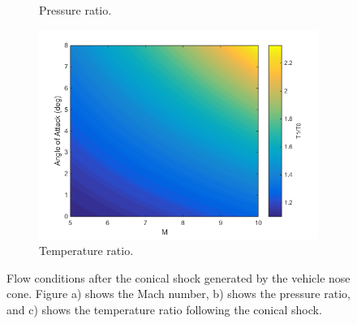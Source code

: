 \begin{figure}
\begin{subfigure}{.5\textwidth}
\caption{Pressure ratio.}
\label{fig:ConicalP}
\end{subfigure}
\begin{subfigure}{.5\textwidth}
\centering
\includegraphics[width=0.99\linewidth]{figures/3_vehicle_design/ConicalT}
\caption{Temperature ratio.}
\label{fig:ConicalT}
\end{subfigure}
\caption{Flow conditions after the conical shock generated by the vehicle nose cone. Figure a) shows the Mach number, b) shows the pressure ratio, and c) shows the temperature ratio following the conical shock.}
\label{fig:ConicalShock}
\end{figure}

